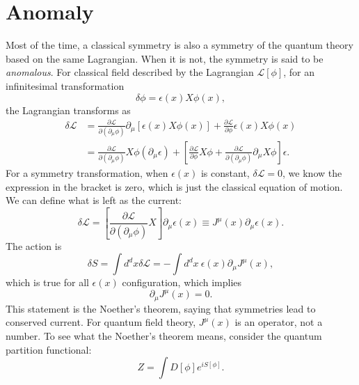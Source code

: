 \chapter{Anomaly}

Most of the time, a classical symmetry is also a symmetry of the quantum theory based on the same Lagrangian.
When it is not, the symmetry is said to be \textit{anomalous}.
For classical field described by the Lagrangian $\mathcal L[\phi]$, for an infinitesimal transformation 
\begin{equation}
	\delta\phi = \epsilon(x) X \phi(x),
\end{equation}
the Lagrangian transforms as
\begin{equation}
\begin{aligned}
	\delta \mathcal L 
	&= \frac{\partial \mathcal L}{\partial(\partial_\mu \phi)} \partial_\mu[\epsilon(x) X \phi(x)] + \frac{\partial \mathcal L}{\partial \phi} \epsilon(x) X \phi(x) \\
	&= \frac{\partial \mathcal L}{\partial(\partial_\mu \phi)}X \phi (\partial_\mu\epsilon) + \left[\frac{\partial \mathcal L}{\partial \phi}X\phi + \frac{\partial \mathcal L}{\partial(\partial_\mu \phi)}\partial_\mu X \phi \right]\epsilon.
\end{aligned}
\end{equation}
For a symmetry transformation, when $\epsilon(x)$ is constant, $\delta \mathcal L = 0$, we know the expression in the bracket is zero, which is just the classical equation of motion.
We can define what is left as the current:
\begin{equation}
	\delta \mathcal L = \left[\frac{\partial \mathcal L}{\partial(\partial_\mu \phi)}X \right] \partial_\mu\epsilon(x)
	\equiv J^\mu(x) \partial_\mu \epsilon(x).
\end{equation}
The action is
\begin{equation}
	\delta S = \int d^d x \delta \mathcal L 
	= -\int d^d x\ \epsilon(x) \partial_\mu J^\mu(x),
\end{equation}
which is true for all $\epsilon(x)$ configuration, which implies
\begin{equation}
	\partial_\mu J^\mu(x) = 0.
\end{equation}
This statement is the Noether's theorem, saying that symmetries lead to conserved current.
For quantum field theory, $J^\mu(x)$ is an operator, not a number.
To see what the Noether's theorem means, consider the quantum partition functional:
\begin{equation}
	Z = \int D[\phi] e^{iS[\phi]}.
\end{equation}
